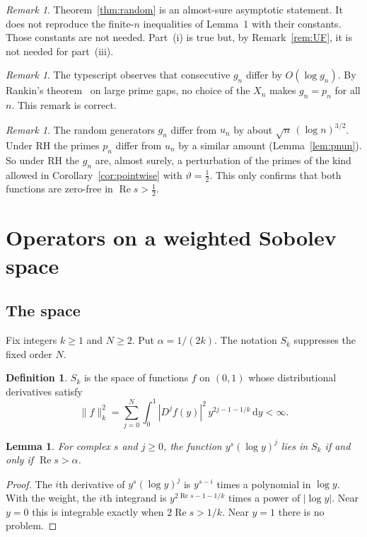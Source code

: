\documentclass[12pt,letterpaper]{article}
\newtheorem{lemma}[theorem]{Lemma}
\theoremstyle{definition}
\newtheorem{definition}[theorem]{Definition}
\theoremstyle{remark}
\newtheorem{remark}[theorem]{Remark}
\newcommand{\Ree}{\operatorname{Re}}
\newcommand{\dd}{\,\mathrm{d}}
\begin{document}
\begin{remark}
Theorem~\ref{thm:random} is an almost-sure asymptotic statement. It does
not reproduce the finite-$n$ inequalities of Lemma~1 with their constants.
Those constants are not needed. Part~(i) is true but, by
Remark~\ref{rem:UF}, it is not needed for part~(iii).
\end{remark}

\begin{remark}
The typescript observes that consecutive $g_n$ differ by $O(\log g_n)$.
By Rankin's theorem~\cite{Ra38} on large prime gaps, no choice of the
$X_n$ makes $g_n=p_n$ for all $n$. This remark is correct.
\end{remark}

\begin{remark}
The random generators $g_n$ differ from $u_n$ by about
$\sqrt{n}\,(\log n)^{3/2}$. Under RH the primes $p_n$ differ from $u_n$ by
a similar amount (Lemma~\ref{lem:pnun}). So under RH the $g_n$ are, almost
surely, a perturbation of the primes of the kind allowed in
Corollary~\ref{cor:pointwise} with $\vartheta=\frac12$. This only
confirms that both functions are zero-free in $\Ree s>\frac12$.
\end{remark}

\section{Operators on a weighted Sobolev space}\label{sec:operators}

\subsection{The space}

Fix integers $k\ge1$ and $N\ge2$. Put $\alpha=1/(2k)$.
The notation $S_k$ suppresses the fixed order $N$.

\begin{definition}
$S_k$ is the space of functions $f$ on $(0,1)$ whose distributional
derivatives satisfy
\[
\|f\|_k^2=\sum_{j=0}^N\int_0^1|D^jf(y)|^2\,y^{2j-1-1/k}\dd y<\infty.
\]
\end{definition}

\begin{lemma}\label{lem:powers}
For complex $s$ and $j\ge0$, the function $y^s(\log y)^j$ lies in $S_k$
if and only if $\Ree s>\alpha$.
\end{lemma}

\begin{proof}
The $i$th derivative of $y^s(\log y)^j$ is $y^{s-i}$ times a polynomial
in $\log y$. With the weight, the $i$th integrand is
$y^{2\Ree s-1-1/k}$ times a power of $|\log y|$. Near $y=0$ this is
integrable exactly when $2\Ree s>1/k$. Near $y=1$ there is no problem.
\end{proof}
\end{document}
